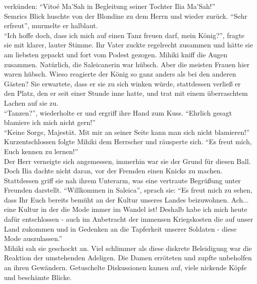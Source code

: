 verkünden: ``Vitoé Ma'Sah in Begleitung seiner Tochter Ilia Ma'Sah!''\\
Semrics Blick huschte von der Blondine zu dem Herrn und wieder zurück. ``Sehr erfreut'', murmelte 
er halblaut.\\
``Ich hoffe doch, dass ich mich auf einen Tanz freuen darf, mein König?'', fragte sie mit klarer, 
lauter Stimme. Ihr Vater zuckte regelrecht zusammen und hätte sie am liebsten gepackt und fort vom 
Podest gezogen. Mihiki kniff die Augen zusammen. Natürlich, die Saleicanerin war hübsch. Aber die 
meisten Frauen hier waren hübsch. Wieso reagierte der König so ganz anders als bei den anderen 
Gästen? Sie erwartete, dass er sie zu sich winken würde, stattdessen verließ er den Platz, den er 
seit einer Stunde inne hatte, und trat mit einem überraschtem Lachen auf sie zu.\\
``Tanzen?'', wiederholte er und ergriff ihre Hand zum Kuss. ``Ehrlich gesagt blamiere ich mich 
nicht gern!''\\
``Keine Sorge, Majestät. Mit mir an seiner Seite kann man sich nicht blamieren!''\\
Kurzentschlossen folgte Mihiki dem Herrscher und räusperte sich. ``Es freut mich, Euch kennen zu 
lernen!''\\
Der Herr verneigte sich angemessen, immerhin war sie der Grund für diesen Ball. Doch Ilia dachte 
nicht daran, vor der Fremden einen Knicks zu machen. Stattdessen griff sie nah ihrem Unterarm, was 
eine vertraute Begrüßung unter Freunden darstellt. ``Willkommen in Saleica'', sprach sie: ``Es 
freut mich zu sehen, dass Ihr Euch bereits bemüht an der Kultur unseres Landes beizuwohnen. Ach... 
eine Kultur in der die Mode immer im Wandel ist! Deshalb habe ich mich heute dafür entschlossen - 
auch im Anbetracht der immensen Kriegskosten die auf unser Land zukommen und in Gedenken an die 
Tapferkeit unserer Soldaten - diese Mode auszulassen.''\\
Mihiki sah sie geschockt an. Viel schlimmer als diese diskrete Beleidigung war die Reaktion der 
umstehenden Adeligen. Die Damen erröteten und zupfte unbeholfen an ihren Gewändern. Getuschelte 
Diskussionen kamen auf, viele nickende Köpfe und beschämte Blicke. 

